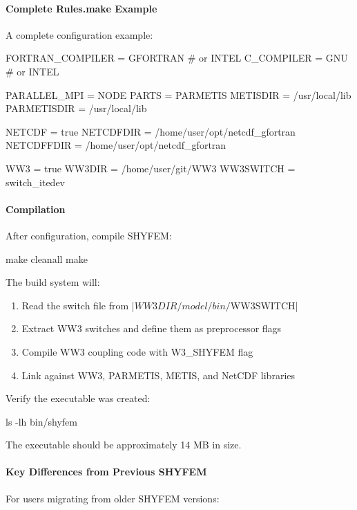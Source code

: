 \paragraph{Complete Rules.make Example}

A complete configuration example:
\begin{code}
FORTRAN_COMPILER = GFORTRAN    # or INTEL
C_COMPILER = GNU               # or INTEL

PARALLEL_MPI = NODE
PARTS = PARMETIS
METISDIR = /usr/local/lib
PARMETISDIR = /usr/local/lib

NETCDF = true
NETCDFDIR = /home/user/opt/netcdf_gfortran
NETCDFFDIR = /home/user/opt/netcdf_gfortran

WW3 = true
WW3DIR = /home/user/git/WW3
WW3SWITCH = switch_itedev
\end{code}

\paragraph{Compilation}

After configuration, compile SHYFEM:
\begin{code}
make cleanall
make
\end{code}

The build system will:
\begin{enumerate}
\item Read the switch file from |$WW3DIR/model/bin/$WW3SWITCH|
\item Extract WW3 switches and define them as preprocessor flags
\item Compile WW3 coupling code with W3\_SHYFEM flag
\item Link against WW3, PARMETIS, METIS, and NetCDF libraries
\end{enumerate}

Verify the executable was created:
\begin{code}
ls -lh bin/shyfem
\end{code}
The executable should be approximately 14 MB in size.

\paragraph{Key Differences from Previous SHYFEM}

For users migrating from older SHYFEM versions:


